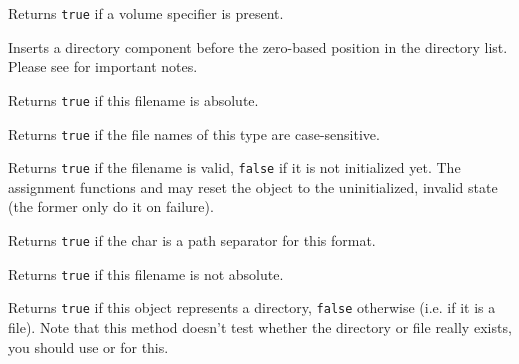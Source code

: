 
Returns {\tt true} if a volume specifier is present.


\label{wxfilenameinsertdir}


Inserts a directory component before the zero-based position in the directory
list. Please see  for important notes.


\label{wxfilenameisabsolute}


Returns {\tt true} if this filename is absolute.


\label{wxfilenameiscasesensitive}


Returns {\tt true} if the file names of this type are case-sensitive.


\label{wxfilenameisok}


Returns {\tt true} if the filename is valid, {\tt false} if it is not
initialized yet. The assignment functions and
 may reset the object to the uninitialized,
invalid state (the former only do it on failure).


\label{wxfilenameispathseparator}


Returns {\tt true} if the char is a path separator for this format.


\label{wxfilenameisrelative}


Returns {\tt true} if this filename is not absolute.


\label{wxfilenameisdir}


Returns {\tt true} if this object represents a directory, {\tt false} otherwise
(i.e. if it is a file). Note that this method doesn't test whether the
directory or file really exists, you should use 
 or 
 for this.

